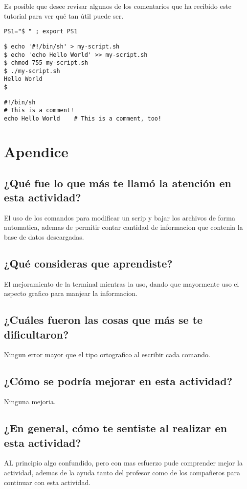 \documentclass{article}
\begin{document}
Es posible que desee revisar algunos de los comentarios que ha recibido este tutorial para ver qué tan útil puede ser.

\begin{verbatim}
PS1="$ " ; export PS1
\end{verbatim}

\begin{verbatim}
$ echo '#!/bin/sh' > my-script.sh
$ echo 'echo Hello World' >> my-script.sh
$ chmod 755 my-script.sh
$ ./my-script.sh
Hello World
$
\end{verbatim}

\begin{verbatim}
#!/bin/sh
# This is a comment!
echo Hello World	# This is a comment, too!
\end{verbatim}
\section{Apendice}
\subsection{¿Qué fue lo que más te llamó la atención en esta actividad?}
El uso de los comandos para modificar un scrip y bajar los archivos de forma automatica, ademas de permitir contar cantidad de informacion que contenia la base de datos descargadas.
\subsection{¿Qué consideras que aprendiste?}
El mejoramiento de la terminal mientras la uso, dando que mayormente uso el aspecto grafico para manjear la informacion.
\subsection{¿Cuáles fueron las cosas que más se te dificultaron?}
Ningun error mayor que el tipo ortografico al escribir cada comando.
\subsection{¿Cómo se podría mejorar en esta actividad?}
Ninguna mejoria.
\subsection{¿En general, cómo te sentiste al realizar en esta actividad?}
AL principio algo confundido, pero con mas esfuerzo pude comprender mejor la actividad, ademas de la ayuda tanto del profesor como de los compañeros para continuar con esta actividad.
\end{document}
